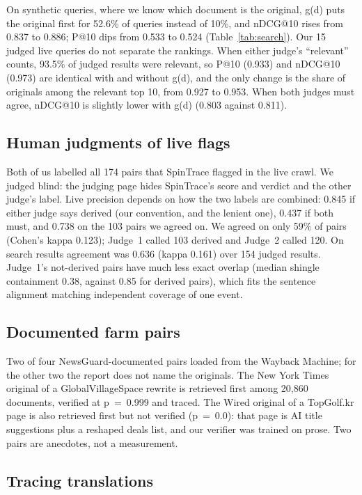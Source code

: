 \documentclass[11pt,a4paper]{article}
\begin{document}
On synthetic queries, where we know which document is the original, g(d) puts the original first for 52.6\% of queries instead of 10\%, and nDCG@10 rises from 0.837 to 0.886; P@10 dips from 0.533 to 0.524 (Table~\ref{tab:search}). Our 15 judged live queries do not separate the rankings. When either judge's ``relevant'' counts, 93.5\% of judged results were relevant, so P@10 (0.933) and nDCG@10 (0.973) are identical with and without g(d), and the only change is the share of originals among the relevant top 10, from 0.927 to 0.953. When both judges must agree, nDCG@10 is slightly lower with g(d) (0.803 against 0.811).

\subsection{Human judgments of live flags}
\label{sec:judged}

Both of us labelled all 174 pairs that SpinTrace flagged in the live crawl. We judged blind: the judging page hides SpinTrace's score and verdict and the other judge's label. Live precision depends on how the two labels are combined: 0.845 if either judge says derived (our convention, and the lenient one), 0.437 if both must, and 0.738 on the 103 pairs we agreed on. We agreed on only 59\% of pairs (Cohen's kappa 0.123); Judge~1 called 103 derived and Judge~2 called 120. On search results agreement was 0.636 (kappa 0.161) over 154 judged results. Judge~1's not-derived pairs have much less exact overlap (median shingle containment 0.38, against 0.85 for derived pairs), which fits the sentence alignment matching independent coverage of one event.

\subsection{Documented farm pairs}

Two of four NewsGuard-documented pairs loaded from the Wayback Machine; for the other two the report does not name the originals. The New York Times original of a GlobalVillageSpace rewrite is retrieved first among 20,860 documents, verified at p~=~0.999 and traced. The Wired original of a TopGolf.kr page is also retrieved first but not verified (p~=~0.0): that page is AI title suggestions plus a reshaped deals list, and our verifier was trained on prose. Two pairs are anecdotes, not a measurement.

\subsection{Tracing translations}
\label{sec:xl}
\end{document}
